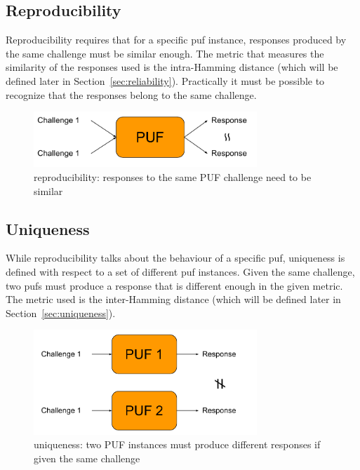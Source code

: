 \subsection*{Reproducibility}\label{sec:reproducibility}

Reproducibility requires that for a specific \gls{puf} instance, responses produced by the same challenge must be similar enough. The metric that measures the similarity of the responses used is the intra-Hamming distance (which will be defined later in Section~\ref{sec:reliability}). Practically it must be possible to recognize that the responses belong to the same challenge.

\begin{figure}[h!]
    \centering
    \captionsetup{justification=centering,margin=0.5cm}
    \includegraphics[width=0.75\textwidth]{images/reproducibility}
    \caption[reproducibility: responses to the same PUF challenge need to be similar]{reproducibility: responses to the same PUF challenge need to be similar~\cite{Kodytek2017}}
    \label{fig:reproducibility}
\end{figure}

\subsection*{Uniqueness}

While reproducibility talks about the behaviour of a specific \gls{puf}, uniqueness is defined with respect to a set of different \gls{puf} instances. Given the same challenge, two \glspl{puf} must produce a response that is different enough in the given metric. The metric used is the inter-Hamming distance (which will be defined later in Section~\ref{sec:uniqueness}).

\begin{figure}[ht!]
    \centering
    \captionsetup{justification=centering,margin=0.5cm}
    \includegraphics[width=0.75\textwidth]{images/uniqueness}
    \caption[uniqueness: two PUF instances must produce different responses if given the same challenge]{uniqueness: two PUF instances must produce different responses if given the same challenge~\cite{Kodytek2017}}
    \label{fig:uniqueness}
\end{figure}

